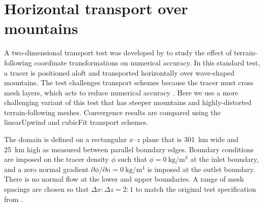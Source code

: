 \section{Horizontal transport over mountains}
\label{sec:cubicFit:schaerAdvect}


A two-dimensional transport test was developed by \citet{schaer2002} to study the effect of terrain-following coordinate transformations on numerical accuracy.  In this standard test, a tracer is positioned aloft and transported horizontally over wave-shaped mountains.  The test challenges transport schemes because the tracer must cross mesh layers, which acts to reduce numerical accuracy \citep{schaer2002}.
Here we use a more challenging variant of this test that has steeper mountains and highly-distorted terrain-following meshes.
Convergence results are compared using the linearUpwind and cubicFit transport schemes.

The domain is defined on a rectangular $x$--$z$ plane that is \SI{301}{\kilo\meter} wide and \SI{25}{\kilo\meter} high as measured between parallel boundary edges.
Boundary conditions are imposed on the tracer density $\phi$ such that $\phi = \SI{0}{\kilo\gram\per\meter\cubed}$ at the inlet boundary, and a zero normal gradient
$\partial \phi / \partial n = \SI{0}{\kilo\gram\per\meter\tothe{4}}$ is imposed at the outlet boundary.  There is no normal flow at the lower and upper boundaries.
A range of mesh spacings are chosen so that $\Delta x \mathbin{:} \Delta z = 2\mathbin{:}1$ to match the original test specification from \citet{schaer2002}.

